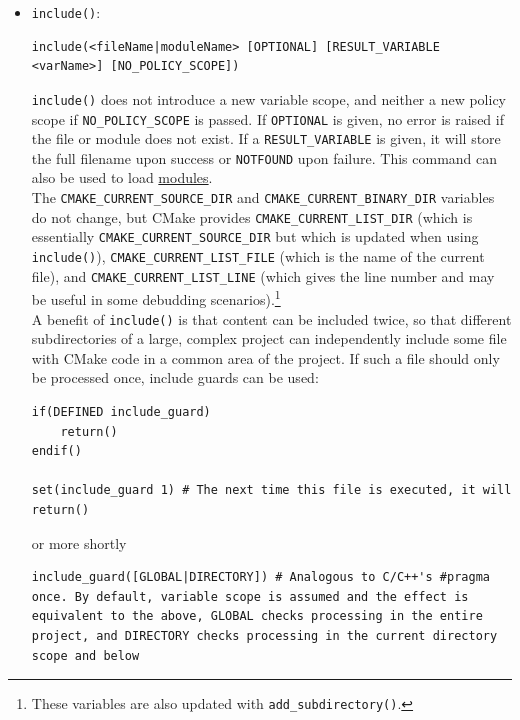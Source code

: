 \documentclass[table, xcdraw]{article}%
\begin{document}
\begin{itemize}
\item \texttt{include()}:

\begin{verbatim}
include(<fileName|moduleName> [OPTIONAL] [RESULT_VARIABLE <varName>] [NO_POLICY_SCOPE])
\end{verbatim}

\texttt{include()} does not introduce a new variable scope, and neither a new policy scope if \texttt{NO_POLICY_SCOPE} is passed. If \texttt{OPTIONAL} is given, no error is raised if the file or module does not exist. If a \texttt{RESULT_VARIABLE} is given, it will store the full filename upon success or \texttt{NOTFOUND} upon failure. This command can also be used to load \hyperref[modules]{modules}.\\
The \texttt{CMAKE_CURRENT_SOURCE_DIR} and \texttt{CMAKE_CURRENT_BINARY_DIR} variables do not change, but CMake provides \texttt{CMAKE_CURRENT_LIST_DIR} (which is essentially \texttt{CMAKE_CURRENT_SOURCE_DIR} but which is updated when using \texttt{include()}), \texttt{CMAKE_CURRENT_LIST_FILE} (which is the name of the current file), and \texttt{CMAKE_CURRENT_LIST_LINE} (which gives the line number and may be useful in some debudding scenarios).\footnote{These variables are also updated with \texttt{add_subdirectory()}.}\\
A benefit of \texttt{include()} is that content can be included twice, so that different subdirectories of a large, complex project can independently include some file with CMake code in a common area of the project. If such a file should only be processed once, include guards can be used:

\begin{verbatim}
if(DEFINED include_guard)
    return()
endif()

set(include_guard 1) # The next time this file is executed, it will return()
\end{verbatim}

or more shortly

\begin{verbatim}
include_guard([GLOBAL|DIRECTORY]) # Analogous to C/C++'s #pragma once. By default, variable scope is assumed and the effect is equivalent to the above, GLOBAL checks processing in the entire project, and DIRECTORY checks processing in the current directory scope and below
\end{verbatim}
\end{itemize}
\end{document}
